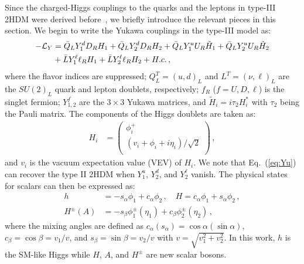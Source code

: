 \documentclass[prd,preprint,superscriptaddress,amsmath,amssymb]{revtex4}
\begin{document}
Since the charged-Higgs couplings to the quarks and the leptons in type-III 2HDM were derived before~\cite{Benbrik:2015evd}, we briefly introduce the relevant pieces in this  section. 
 We begin to write the Yukawa couplings in the  type-III model as:
%
\begin{align}
-{\cal L}_Y &=  \bar Q_L Y^d_1 D_R H_1 + \bar Q_L Y^{d}_2 D_R H_2
+ \bar Q_L Y^u_1 U_R \tilde H_1 + \bar Q_L Y^{u}_2 U_R \tilde H_2
 \nonumber \\
&+  \bar L Y^\ell_1 \ell_R H_1 + \bar L Y^{\ell}_2 \ell_R H_2 + H.c.\,, 
\label{eq:Yu}
\end{align}
where the flavor indices are suppressed; $Q^T_L=(u, d)_L$ and $L^T = (\nu, \ell)_L$ are the $SU(2)_L$ quark and lepton doublets, respectively; $f_R$ ($f=U,D,\ell$) is the singlet  fermion;  $Y^f_{1,2}$ are the $3\times 3$ Yukawa matrices, and $\tilde H_i = i\tau_2 H^*_i$ with $\tau_2$ being the  Pauli matrix. The components of  the Higgs doublets are  taken as:
\begin{align}
H_i &= \left(
            \begin{array}{c}
              \phi^+_i \\
              (v_i+\phi_i +i \eta_i)/\sqrt{2} \\
            \end{array}
          \right)\,, \label{eq:doublet}
\end{align}
and $v_i$ is the vacuum expectation value (VEV) of $H_i$. We note that Eq.~(\ref{eq:Yu}) can  recover  the type II 2HDM  when $Y^u_1$, $Y^d_2$, and $Y^\ell_2$ vanish. The physical states for scalars can then be expressed as: 
\begin{align}
 h &= -s_\alpha \phi_1 + c_\alpha  \phi_2 \,, \quad H= c_\alpha \phi_1 + s_\alpha \phi_2 \,, \nonumber \\
H^\pm (A) &= -s_\beta \phi^\pm_1 (\eta_1) + c_\beta \phi^\pm_2 (\eta_2) \,, \label{eq:hHHA}
\end{align}
where the mixing angles are defined as $c_\alpha (s_\alpha)= \cos\alpha (\sin\alpha)$, $c_\beta  = \cos\beta = v_1/v$, and $s_\beta= \sin\beta = v_2/v$ with $v=\sqrt{v^2_1 +v^2_2}$.  In this work, $h$ is the SM-like Higgs while $H$, $A$, and $H^\pm$ are new scalar bosons. 
\end{document}
